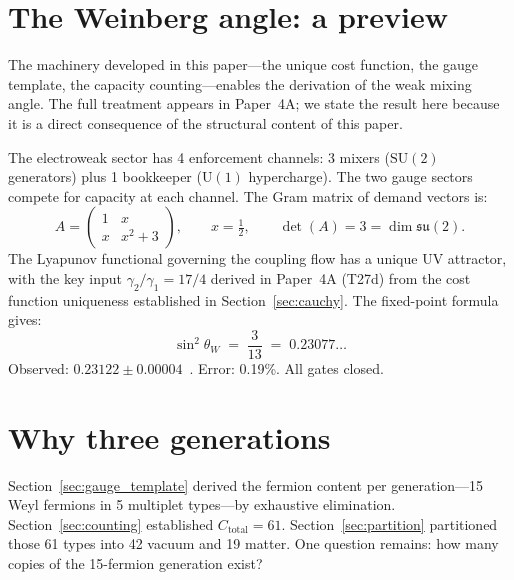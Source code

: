 \documentclass[11pt]{article}
\newcommand{\SU}{\mathrm{SU}}
\newcommand{\U}{\mathrm{U}}
\begin{document}
\section{The Weinberg angle: a preview}
\label{sec:weinberg}

The machinery developed in this paper---the unique cost function, the gauge template, the capacity counting---enables the derivation of the weak mixing angle.  The full treatment appears in Paper~4A; we state the result here because it is a direct consequence of the structural content of this paper.

The electroweak sector has 4 enforcement channels: 3 mixers ($\SU(2)$ generators) plus 1 bookkeeper ($\U(1)$ hypercharge).  The two gauge sectors compete for capacity at each channel.  The Gram matrix of demand vectors is:
\begin{equation}
A = \begin{pmatrix} 1 & x \\ x & x^2 + 3 \end{pmatrix}, \qquad x = \tfrac{1}{2}, \qquad \det(A) = 3 = \dim\mathfrak{su}(2).
\label{eq:weinberg_matrix}
\end{equation}
The Lyapunov functional governing the coupling flow has a unique UV attractor, with the key input $\gamma_2/\gamma_1 = 17/4$ derived in Paper~4A (T27d) from the cost function uniqueness established in Section~\ref{sec:cauchy}.  The fixed-point formula gives:
\begin{equation}
\sin^2\!\theta_W \;=\; \frac{3}{13} \;=\; 0.23077\ldots
\label{eq:weinberg_value}
\end{equation}
Observed: $0.23122 \pm 0.00004$~\cite{PDG2024}.  Error: 0.19\%.  All gates closed.


\section{Why three generations}
\label{sec:generations}

Section~\ref{sec:gauge_template} derived the fermion content per generation---15 Weyl fermions in 5 multiplet types---by exhaustive elimination.  Section~\ref{sec:counting} established $C_{\mathrm{total}} = 61$.  Section~\ref{sec:partition} partitioned those 61 types into 42 vacuum and 19 matter.  One question remains: how many copies of the 15-fermion generation exist?
\end{document}
